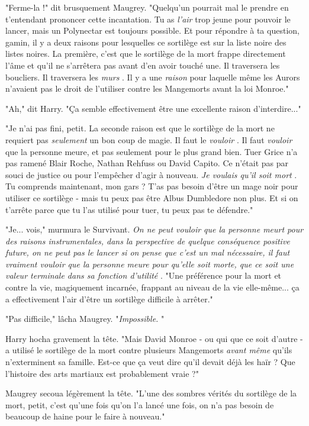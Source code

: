 "Ferme-la !" dit brusquement Maugrey. "Quelqu'un pourrait mal le prendre en t'entendant prononcer cette incantation. Tu as \emph{l'air}  trop jeune pour pouvoir le lancer, mais un Polynectar est toujours possible. Et pour répondre à ta question, gamin, il y a deux raisons pour lesquelles ce sortilège est sur la liste noire des listes noires. La première, c'est que le sortilège de la mort frappe directement l'âme et qu'il ne s'arrêtera pas avant d'en avoir touché une. Il traversera les boucliers. Il traversera les \emph{murs} . Il y a une \emph{raison}  pour laquelle même les Aurors n'avaient pas le droit de l'utiliser contre les Mangemorts avant la loi Monroe."

"Ah," dit Harry. "Ça semble effectivement être une excellente raison d'interdire..."

"Je n'ai pas fini, petit. La seconde raison est que le sortilège de la mort ne requiert pas \emph{seulement } un bon coup de magie. Il faut le \emph{vouloir} . Il faut \emph{vouloir } que la personne meure, et pas seulement pour le plus grand bien. Tuer Grice n'a pas ramené Blair Roche, Nathan Rehfuss ou David Capito. Ce n'était pas par souci de justice ou pour l'empêcher d'agir à nouveau. \emph{Je voulais qu'il soit mort} . Tu comprends maintenant, mon gars ? T'as pas besoin d'être un mage noir pour utiliser ce sortilège - mais tu peux pas être Albus Dumbledore non plus. Et si on t'arrête parce que tu l'as utilisé pour tuer, tu peux pas te défendre."

"Je... vois," murmura le Survivant. \emph{On ne peut vouloir que la personne meurt pour des raisons instrumentales, dans la perspective de quelque conséquence positive future, on ne peut pas le lancer si on pense que c'est un mal nécessaire, il faut vraiment vouloir que la personne meure pour qu'elle soit morte, que ce soit une valeur terminale dans sa fonction d'utilité} . "Une préférence pour la mort et contre la vie, magiquement incarnée, frappant au niveau de la vie elle-même... ça a effectivement l'air d'être un sortilège difficile à arrêter."

"Pas difficile," lâcha Maugrey. "\emph{Impossible.} "

Harry hocha gravement la tête. "Mais David Monroe - ou qui que ce soit d'autre - a utilisé le sortilège de la mort contre plusieurs Mangemorts \emph{avant même } qu'ils n'exterminent sa famille. Est-ce que ça veut dire qu'il devait déjà les haïr ? Que l'histoire des arts martiaux est probablement vraie ?"

Maugrey secoua légèrement la tête. "L'une des sombres vérités du sortilège de la mort, petit, c'est qu'une fois qu'on l'a lancé une fois, on n'a pas besoin de beaucoup de haine pour le faire à nouveau."

